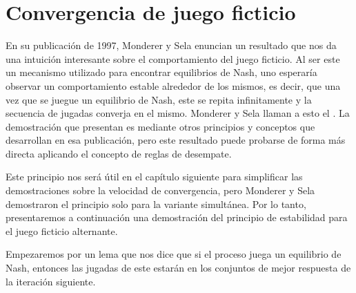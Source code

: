\section{Convergencia de juego ficticio} \label{sec:convergencia:fp}

En su publicación de 1997, Monderer y Sela \cite{no:cycling} enuncian un resultado que nos da una intuición interesante sobre el comportamiento del juego ficticio. Al ser este un mecanismo utilizado para encontrar equilibrios de Nash, uno esperaría observar un comportamiento estable alrededor de los mismos, es decir, que una vez que se juegue un equilibrio de Nash, este se repita infinitamente y la secuencia de jugadas converja en el mismo. Monderer y Sela llaman a esto el . La demostración que presentan es mediante otros principios y conceptos que desarrollan en esa publicación, pero este resultado puede probarse de forma más directa aplicando el concepto de reglas de desempate.

Este principio nos será útil en el capítulo siguiente para simplificar las demostraciones sobre la velocidad de convergencia, pero Monderer y Sela demostraron el principio solo para la variante simultánea. Por lo tanto, presentaremos a continuación una demostración del principio de estabilidad para el juego ficticio alternante.

Empezaremos por un lema que nos dice que si el proceso juega un equilibrio de Nash, entonces las jugadas de este estarán en los conjuntos de mejor respuesta de la iteración siguiente. 

